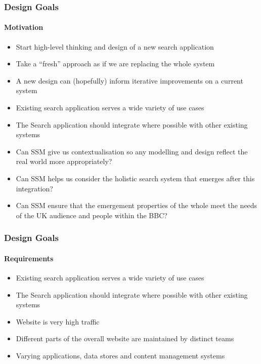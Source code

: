 \documentclass{beamer}
\begin{document}
\begin{frame}
  \frametitle{Design Goals}
  \framesubtitle{Motivation}
  \begin{itemize}
    \pause \item Start high-level thinking and design of a new search application
    \pause \item Take a ``fresh'' approach as if we are replacing the whole system
    \pause \item A new design can (hopefully) inform iterative improvements on a current system
    \pause \item Existing search application serves a wide variety of use cases
    \pause \item The Search application should integrate where possible with other existing systems
    \pause \item Can SSM give us contextualisation so any modelling and design reflect the real world more appropriately?
    \pause \item Can SSM helps us consider the holistic search system that emerges after this integration?
    \pause \item Can SSM ensure that the emergement properties of the whole meet the needs of the UK audience and people within the BBC?
  \end{itemize}
\end{frame}

\begin{frame}
  \frametitle{Design Goals}
  \framesubtitle{Requirements}
  \begin{itemize}
    \pause \item Existing search application serves a wide variety of use cases
    \pause \item The Search application should integrate where possible with other existing systems
    \pause \item Website is very high traffic
    \pause \item Different parts of the overall website are maintained by distinct teams
    \pause \item Varying applications, data stores and content management systems
  \end{itemize}
\end{frame}
\end{document}
